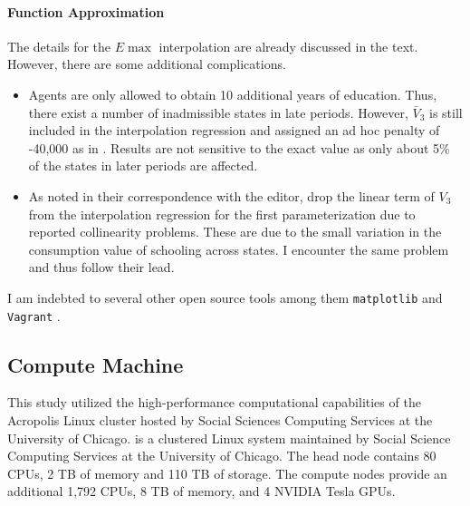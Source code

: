 \paragraph{Function Approximation} The details for the $E\max$ interpolation are already discussed in the text. However, there are some additional complications.
%
\begin{itemize}
\item Agents are only allowed to obtain 10 additional years of education. Thus, there exist a number of inadmissible states in late periods. However, $\bar{V}_3$ is still included in the interpolation regression and assigned an ad hoc penalty of -40,000 as in \citet{Keane.1994}. Results are not sensitive to the exact value as only about 5\% of the states in later periods are affected.
\item As noted in their correspondence with the editor, \citet{Keane.1994} drop the linear term of $V_3$ from the interpolation regression for the first parameterization due to reported collinearity problems. These are due to the small variation in the consumption value of schooling across states. I encounter the same problem and thus follow their lead.
\end{itemize}

I am indebted to several other open source tools among them \texttt{matplotlib} \citep{Matplotlib.2007} and \texttt{Vagrant} \citep{Hashimoto.2013}.
\subsection{Compute Machine}
\noindent This study utilized the high-performance computational capabilities of the Acropolis Linux cluster hosted by Social Sciences Computing Services at the University of Chicago.  is a clustered Linux system maintained by Social Science Computing Services at the University of Chicago. The head node contains 80 CPUs, 2 TB of memory and 110 TB of storage. The compute nodes provide an additional 1,792 CPUs, 8 TB of memory, and 4 NVIDIA Tesla GPUs.
